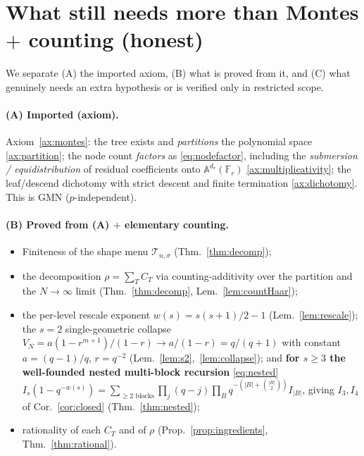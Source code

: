 \documentclass[11pt]{article}
\theoremstyle{definition}
\theoremstyle{remark}
\newcommand{\Fr}{\mathbb{F}_r}
\begin{document}
\section{What still needs more than Montes $+$ counting (honest)}\label{sec:honest}

We separate (A) the imported axiom, (B) what is proved from it, and (C) what
genuinely needs an extra hypothesis or is verified only in restricted scope.

\paragraph{(A) Imported (axiom).} Axiom~\ref{ax:montes}: the tree exists and
\emph{partitions} the polynomial space \ref{ax:partition}; the node count
\emph{factors} as \eqref{eq:nodefactor}, including the \emph{submersion /
equidistribution} of residual coefficients onto $\mathbb A^{d_r}(\Fr)$
\ref{ax:multiplicativity}; the leaf/descend dichotomy with strict descent and
finite termination \ref{ax:dichotomy}. This is GMN ($p$-independent).

\paragraph{(B) Proved from (A) $+$ elementary counting.}
\begin{itemize}[nosep]
\item Finiteness of the shape menu $\mathcal T_{n,\sigma}$ (Thm.~\ref{thm:decomp});
\item the decomposition $\rho=\sum_T C_T$ via counting-additivity over the
partition and the $N\to\infty$ limit (Thm.~\ref{thm:decomp},
Lem.~\ref{lem:countHaar});
\item the per-level rescale exponent $w(s)=s(s+1)/2-1$ (Lem.~\ref{lem:rescale});
the $s=2$ single-geometric collapse
$V_N=a(1-r^{m+1})/(1-r)\to a/(1-r)=q/(q+1)$ with constant $a=(q-1)/q$,
$r=q^{-2}$ (Lem.~\ref{lem:s2},~\ref{lem:collapse}); and \textbf{for $s\ge3$ the
well-founded nested multi-block recursion} \eqref{eq:nested}
$I_s(1-q^{-w(s)})=\sum_{\ge2\text{ blocks}}\prod_j(q-j)\prod_B q^{-(|B|+\binom{|B|}2)}I_{|B|}$,
giving $I_3,I_4$ of Cor.~\ref{cor:closed} (Thm.~\ref{thm:nested});
\item rationality of each $C_T$ and of $\rho$ (Prop.~\ref{prop:ingredients},
Thm.~\ref{thm:rational}).
\end{itemize}
\end{document}
